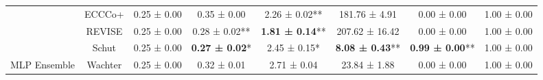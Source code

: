 \begin{table}
{\begin{tabular}[t]{cccccccc}
 & ECCCo+ & 0.25 ± 0.00\hphantom{*}\hphantom{*} & 0.35 ± 0.00\hphantom{*}\hphantom{*} & 2.26 ± 0.02** & 181.76 ± 4.91\hphantom{*}\hphantom{*} & 0.00 ± 0.00\hphantom{*}\hphantom{*} & 1.00 ± 0.00\hphantom{*}\hphantom{*}\\

 & REVISE & 0.25 ± 0.00\hphantom{*}\hphantom{*} & 0.28 ± 0.02** & \textbf{1.81 ± 0.14}** & 207.62 ± 16.42\hphantom{*}\hphantom{*} & 0.00 ± 0.00\hphantom{*}\hphantom{*} & 1.00 ± 0.00\hphantom{*}\hphantom{*}\\

 & Schut & 0.25 ± 0.00\hphantom{*}\hphantom{*} & \textbf{0.27 ± 0.02}*\hphantom{*} & 2.45 ± 0.15*\hphantom{*} & \textbf{8.08 ± 0.43}** & \textbf{0.99 ± 0.00}** & 1.00 ± 0.00\hphantom{*}\hphantom{*}\\

\multirow[t]{-6}{*}{\centering\arraybackslash MLP Ensemble} & Wachter & 0.25 ± 0.00\hphantom{*}\hphantom{*} & 0.32 ± 0.01\hphantom{*}\hphantom{*} & 2.71 ± 0.04\hphantom{*}\hphantom{*} & 23.84 ± 1.88\hphantom{*}\hphantom{*} & 0.00 ± 0.00\hphantom{*}\hphantom{*} & 1.00 ± 0.00\hphantom{*}\hphantom{*}\\
\bottomrule
\end{tabular}}
\end{table}
